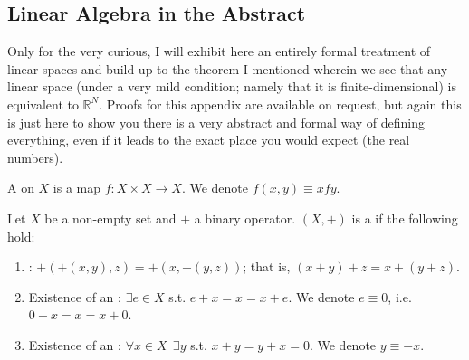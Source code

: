 \documentclass{article}
\begin{document}
\clearpage

\setcounter{subsection}{0}
\renewcommand\thesubsection{\Alph{subsection}}
\titleformat{\subsection}[display]{
  \Large\bfseries
}{Appendix \thesubsection. #1}{0pt}{\vspace{-24pt}}
\renewcommand\thesubsubsection{\Alph{subsection}.\arabic{subsubsection}}

\subsection{Linear Algebra in the Abstract}
\label{sub:appendix_linear_algebra_in_the_abstract}

Only for the very curious, I will exhibit here an entirely formal treatment of linear spaces and build up to the theorem I mentioned wherein we see that any linear space (under a very mild condition; namely that it is finite-dimensional) is equivalent to $\mathbb{R}^N$. Proofs for this appendix are available on request, but again this is just here to show you there is a very abstract and formal way of defining everything, even if it leads to the exact place you would expect (the  real numbers).

\begin{definition}
  A  on $X$ is a map $f: X \times X \to X$. We denote $f(x, y) \equiv x f y$.
\end{definition}

\begin{definition}
  Let $X$ be a non-empty set and $+$ a binary operator. $(X, +)$ is a  if the following hold:
  \begin{enumerate}
    \item {}: $+(+(x, y), z) = +(x, +(y, z))$; that is, $(x + y) + z = x + (y + z)$.

    \item Existence of an : $\exists e \in X$ s.t. $e + x = x = x + e$. We denote $e \equiv 0$, i.e. $0 + x = x = x + 0$.

    \item Existence of an : $\forall x \in X ~~ \exists y$ s.t. $x + y = y + x = 0$. We denote $y \equiv -x$.
  \end{enumerate}
\end{definition}
\end{document}
